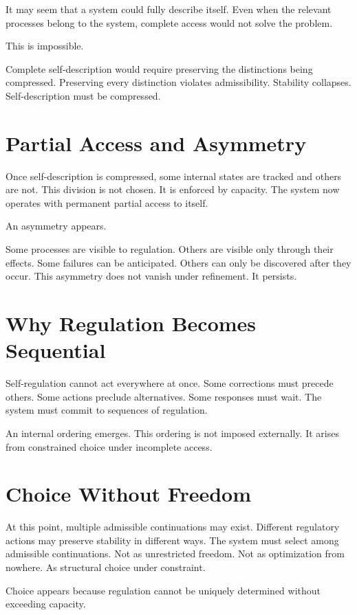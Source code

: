 \documentclass[11pt,twoside,openright]{book}
\begin{document}
It may seem that a system could fully describe itself. Even when the relevant processes belong to the system, complete access would not solve the problem.

This is impossible.

Complete self-description would require preserving the distinctions being compressed. Preserving every distinction violates admissibility. Stability collapses. Self-description must be compressed.

\section*{Partial Access and Asymmetry}

Once self-description is compressed, some internal states are tracked and others are not. This division is not chosen. It is enforced by capacity. The system now operates with permanent partial access to itself.

An asymmetry appears.

Some processes are visible to regulation. Others are visible only through their effects. Some failures can be anticipated. Others can only be discovered after they occur. This asymmetry does not vanish under refinement. It persists.

\section*{Why Regulation Becomes Sequential}

Self-regulation cannot act everywhere at once. Some corrections must precede others. Some actions preclude alternatives. Some responses must wait. The system must commit to sequences of regulation.

An internal ordering emerges. This ordering is not imposed externally. It arises from constrained choice under incomplete access.

\section*{Choice Without Freedom}

At this point, multiple admissible continuations may exist. Different regulatory actions may preserve stability in different ways. The system must select among admissible continuations. Not as unrestricted freedom. Not as optimization from nowhere. As structural choice under constraint.

Choice appears because regulation cannot be uniquely determined without exceeding capacity.
\end{document}
